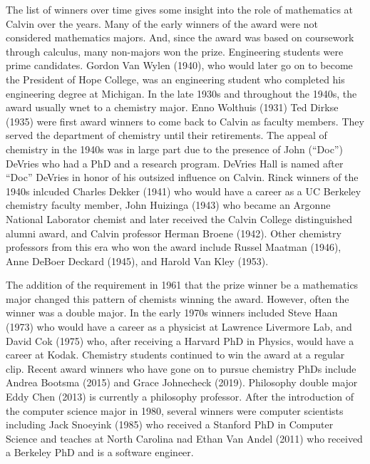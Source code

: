 \documentclass[
]{book}
\begin{document}
The list of winners over time gives some insight into the role of mathematics at Calvin over the years. Many of the early winners of the award were not considered mathematics majors. And, since the award was based on coursework through calculus, many non-majors won the prize. Engineering students were prime candidates. Gordon Van Wylen (1940), who would later go on to become the President of Hope College, was an engineering student who completed his engineering degree at Michigan. In the late 1930s and throughout the 1940s, the award usually wnet to a chemistry major. Enno Wolthuis (1931) Ted Dirkse (1935) were first award winners to come back to Calvin as faculty members. They served the department of chemistry until their retirements. The appeal of chemistry in the 1940s was in large part due to the presence of John (``Doc'') DeVries who had a PhD and a research program. DeVries Hall is named after ``Doc'' DeVries in honor of his outsized influence on Calvin. Rinck winners of the 1940s inlcuded Charles Dekker (1941) who would have a career as a UC Berkeley chemistry faculty member, John Huizinga (1943) who became an Argonne National Laborator chemist and later received the Calvin College distinguished alumni award, and Calvin professor Herman Broene (1942). Other chemistry professors from this era who won the award include Russel Maatman (1946), Anne DeBoer Deckard (1945), and Harold Van Kley (1953).

The addition of the requirement in 1961 that the prize winner be a mathematics major changed this pattern of chemists winning the award. However, often the winner was a double major. In the early 1970s winners included Steve Haan (1973) who would have a career as a physicist at Lawrence Livermore Lab, and David Cok (1975) who, after receiving a Harvard PhD in Physics, would have a career at Kodak. Chemistry students continued to win the award at a regular clip. Recent award winners who have gone on to pursue chemistry PhDs include Andrea Bootsma (2015) and Grace Johnecheck (2019). Philosophy double major Eddy Chen (2013) is currently a philosophy professor. After the introduction of the computer science major in 1980, several winners were computer scientists including Jack Snoeyink (1985) who received a Stanford PhD in Computer Science and teaches at North Carolina nad Ethan Van Andel (2011) who received a Berkeley PhD and is a software engineer.
\end{document}
